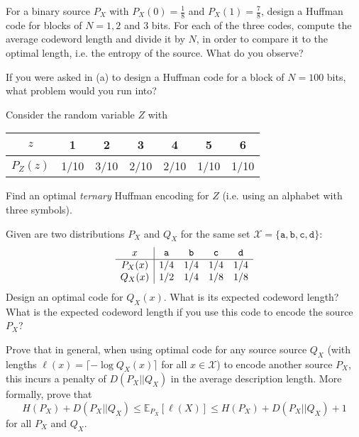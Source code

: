 \documentclass[a4paper,10pt,landscape,twocolumn]{scrartcl}
\begin{document}
\begin{exercise}
	\begin{subex}[(4pt)]
	For a binary source $P_X$ with $P_X(0) = \frac{1}{8}$ and $P_X(1) = \frac{7}{8}$, design a Huffman code for blocks of $N = 1,2$ and 3 bits. For each of the three codes, compute the average codeword length and divide it by $N$, in order to compare it to the optimal length, i.e. the entropy of the source. What do you observe?
	\end{subex}
	\begin{subex}[(1pt)]
	If you were asked in (a) to design a Huffman code for a block of $N = 100$ bits, what problem would you run into?
	\end{subex}
	\begin{subex}[(2pt)]
	Consider the random variable $Z$ with
	\begin{center}
	\begin{tabular}{c | c c c c c c}
	$z$ & 1 & 2 & 3 & 4 & 5 & 6\\
	\hline
	$P_Z(z)$ & 1/10 & 3/10 & 2/10 & 2/10 & 1/10 & 1/10\\
	\end{tabular}
	\end{center}
	Find an optimal \emph{ternary} Huffman encoding for $Z$ (i.e. using an alphabet with three symbols).
	\end{subex}
\end{exercise}



\begin{exercise}
\begin{subex}[(2pt)]
Given are two distributions $P_X$ and $Q_X$ for the same set $\mathcal{X} = \{\mathtt{a,b,c,d}\}$:
\[
\begin{array}{c | c c c c}
x & \mathtt{a}&\mathtt{b}&\mathtt{c}&\mathtt{d}\\\hline
P_X(x) & 1/4&1/4&1/4&1/4\\
Q_X(x) & 1/2&1/4&1/8&1/8\\
\end{array}
\]
Design an optimal code for $Q_X(x)$. What is its expected codeword length? What is the expected codeword length if you use this code to encode the source $P_X$?
\end{subex}
\begin{subex}[(4pt)]
Prove that in general, when using optimal code for any source source $Q_X$ (with lengths $\ell(x) = \lceil -\log Q_X(x) \rceil$ for all $x \in \mathcal{X}$) to encode another source $P_X$, this incurs a penalty of $D(P_X||Q_X)$ in the average description length. More formally, prove that
\[
H(P_X) + D(P_X||Q_X) \leq \mathbb{E}_{P_X}[\ell(X)] \leq H(P_X) + D(P_X||Q_X) + 1
\]
for all $P_X$ and $Q_X$.
\end{subex}
\end{exercise}
\end{document}
